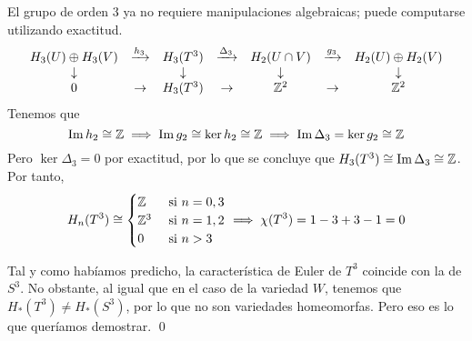 El grupo de orden 3 ya no requiere manipulaciones algebraicas; puede computarse utilizando exactitud.
\[\begin{array}{ccccccc}
H_3(U)\oplus H_3(V)	&\xrightarrow{h_3}	&H_3(T^3)		&\xrightarrow{\Delta_3}&H_2(U \cap V)&\xrightarrow{g_3}&H_2(U)\oplus H_2(V)\\
\downarrow			&					&\downarrow	&					&\downarrow & & \downarrow\\
0			&\rightarrow			&H_3(T^3)		&\rightarrow			&\mathbb{Z}^2 & \rightarrow & \mathbb{Z}^2
\end{array}\] Tenemos que \[\operatorname{Im} h_2\cong \mathbb{Z} \implies \operatorname{Im} g_2\cong \ker h_2\cong \mathbb{Z}\implies \operatorname{Im} \Delta_3=\ker g_2\cong \mathbb{Z}\] Pero $\ker \Delta_3=0$ por exactitud, por lo que se concluye que $H_3(T^3)\cong \operatorname{Im} \Delta_3 \cong \mathbb{Z}$. Por tanto, \[H_n(T^3)\cong \begin{cases}\mathbb{Z} &\mbox{ si }n=0,3\\ \mathbb{Z}^3 & \mbox{ si }n=1,2\\ 0&\mbox{ si }n > 3\end{cases} \implies \chi(T^3)=1-3+3-1=0\]

Tal y como habíamos predicho, la característica de Euler de $T^3$ coincide con la de $S^3$. No obstante, al igual que en el caso de la variedad $W$, tenemos que $H_*(T^3)\neq H_*(S^3)$, por lo que no son variedades homeomorfas. Pero eso es lo que queríamos demostrar. \qed
